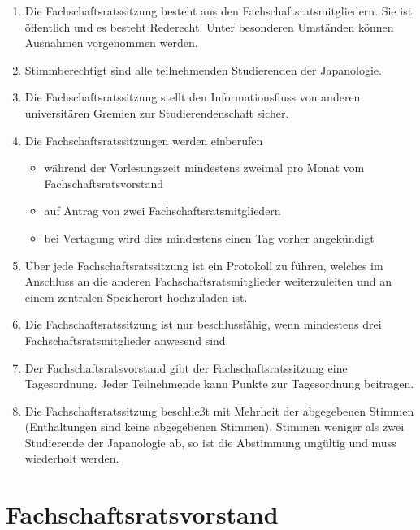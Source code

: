 \documentclass[12pt]{scrartcl}
\begin{document}
\begin{enumerate}
	\item Die Fachschaftsratssitzung besteht aus den Fachschaftsratsmitgliedern. Sie ist öffentlich und es besteht Rederecht. Unter besonderen Umständen können Ausnahmen vorgenommen werden.
	\item Stimmberechtigt sind alle teilnehmenden Studierenden der Japanologie.
	\item Die Fachschaftsratssitzung stellt den Informationsfluss von anderen universitären Gremien zur Studierendenschaft sicher.
	\item Die Fachschaftsratssitzungen werden einberufen
	\begin{itemize}
		\item während der Vorlesungszeit mindestens zweimal pro Monat vom Fachschaftsratsvorstand
		\item auf Antrag von zwei Fachschaftsratsmitgliedern
		\item bei Vertagung wird dies mindestens einen Tag vorher angekündigt
	\end{itemize}
	\item Über jede Fachschaftsratssitzung ist ein Protokoll zu führen, welches im Anschluss an die anderen Fachschaftsratsmitglieder weiterzuleiten und an einem zentralen Speicherort hochzuladen ist.
	\item Die Fachschaftsratssitzung ist nur beschlussfähig, wenn mindestens drei Fachschaftsratsmitglieder anwesend sind.
	\item Der Fachschaftsratsvorstand gibt der Fachschaftsratssitzung eine Tagesordnung. Jeder Teilnehmende kann Punkte zur Tagesordnung beitragen.
	\item Die Fachschaftsratssitzung beschließt mit Mehrheit der abgegebenen Stimmen (Enthaltungen sind keine abgegebenen Stimmen). Stimmen weniger als zwei Studierende der Japanologie ab, so ist die Abstimmung ungültig und muss wiederholt werden. 
\end{enumerate}

\section{Fachschaftsratsvorstand}
\end{document}
